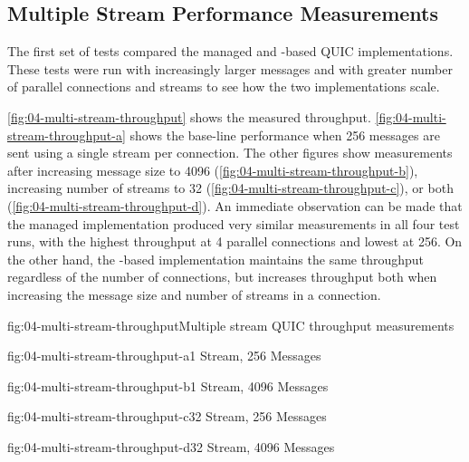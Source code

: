 \subsection{Multiple Stream Performance Measurements}\label{sec:04-multi-stream-perf}

The first set of tests compared the managed and \libmsquic{}-based QUIC implementations. These tests
were run with increasingly larger messages and with greater number of parallel connections and
streams to see how the two implementations scale.

 \autoref{fig:04-multi-stream-throughput} shows the
measured throughput. \autoref{fig:04-multi-stream-throughput-a} shows the base-line performance when
\SI{256}{\byte} messages are sent using a single stream per connection. The other figures show
measurements after increasing message size to \SI{4096}{\byte}
(\autoref{fig:04-multi-stream-throughput-b}), increasing number of streams to 32
(\autoref{fig:04-multi-stream-throughput-c}), or both (\autoref{fig:04-multi-stream-throughput-d}).
An immediate observation can be made that the managed implementation produced very similar
measurements in all four test runs, with the highest throughput at 4 parallel connections and lowest
at 256. On the other hand, the \libmsquic{}-based implementation maintains the same throughput
regardless of the number of connections, but increases throughput both when increasing the message
size and number of streams in a connection.

\begin{myFigure}{fig:04-multi-stream-throughput}{Multiple stream QUIC throughput measurements}
\begin{mySubfigure}{0.49\linewidth}{fig:04-multi-stream-throughput-a}{1 Stream, \SI{256}{\byte} Messages}
\footnotesize

\end{mySubfigure}
\begin{mySubfigure}{0.49\linewidth}{fig:04-multi-stream-throughput-b}{1 Stream, \SI{4096}{\byte} Messages}
\footnotesize

\end{mySubfigure}

\begin{mySubfigure}{0.49\linewidth}{fig:04-multi-stream-throughput-c}{32 Stream, \SI{256}{\byte} Messages}
\footnotesize

\end{mySubfigure}
\begin{mySubfigure}{0.49\linewidth}{fig:04-multi-stream-throughput-d}{32 Stream, \SI{4096}{\byte} Messages}
\footnotesize

\end{mySubfigure}
\end{myFigure}

